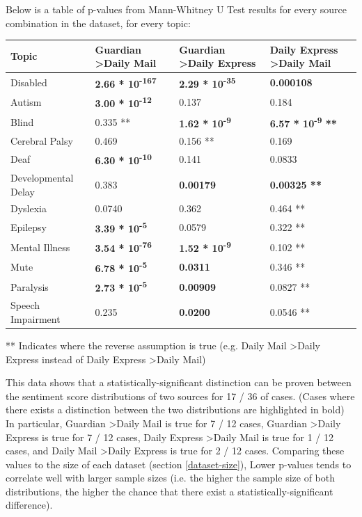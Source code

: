 \documentclass{report}
\begin{document}
Below is a table of p-values from Mann-Whitney U Test results for every source combination in the dataset, for every topic:

\noindent
\begin{tabu} to 1.0\textwidth { | X[c] | X[c] | X[c] | X[c] | }
	\hline
	Topic & Guardian \textgreater\space Daily Mail & Guardian \textgreater\space Daily Express & Daily Express \textgreater\space Daily Mail  \\
		\hline
	Disabled & \textbf{2.66 * 10\textsuperscript{-167}} & \textbf{2.29 * 10\textsuperscript{-35}} & \textbf{0.000108}  \\
	\hline
	Autism & \textbf{3.00 * 10\textsuperscript{-12}} & 0.137 & 0.184  \\
	\hline
	Blind & 0.335 ** & \textbf{1.62 * 10\textsuperscript{-9}} & \textbf{6.57 * 10\textsuperscript{-9} **} \\
	\hline
	Cerebral Palsy & 0.469 & 0.156 ** & 0.169  \\
	\hline
	Deaf & \textbf{6.30 * 10\textsuperscript{-10}} & 0.141 & 0.0833  \\
	\hline
	Developmental Delay & 0.383 & \textbf{0.00179} & \textbf{0.00325 **}  \\
	\hline
	Dyslexia & 0.0740 & 0.362 & 0.464 **  \\
	\hline
	Epilepsy & \textbf{3.39 * 10\textsuperscript{-5}} & 0.0579 & 0.322 **  \\
	\hline
	Mental Illness & \textbf{3.54 * 10\textsuperscript{-76}} & \textbf{1.52 * 10\textsuperscript{-9}} & 0.102 **  \\
	\hline
	Mute & \textbf{6.78 * 10\textsuperscript{-5}} & \textbf{0.0311} & 0.346 ** \\
	\hline
	Paralysis & \textbf{2.73 * 10\textsuperscript{-5}} & \textbf{0.00909} & 0.0827 **  \\
	\hline
	Speech Impairment & 0.235 & \textbf{0.0200} & 0.0546 **  \\
	\hline
\end{tabu}
** Indicates where the reverse assumption is true (e.g. Daily Mail \textgreater\space Daily Express instead of Daily Express \textgreater\space Daily Mail)

This data shows that a statistically-significant distinction can be proven between the sentiment score distributions of two sources for 17 / 36 of cases.
(Cases where there exists a distinction between the two distributions are highlighted in bold)
In particular, Guardian \textgreater\space Daily Mail is true for 7 / 12 cases, Guardian \textgreater\space Daily Express is true for 7 / 12 cases, Daily Express \textgreater\space Daily Mail is true for 1 / 12 cases, and Daily Mail \textgreater\space Daily Express is true for 2 / 12 cases.
Comparing these values to the size of each dataset (section \ref{dataset-size}), Lower p-values tends to correlate well with larger sample sizes (i.e. the higher the sample size of both distributions, the higher the chance that there exist a statistically-significant difference).
\end{document}

